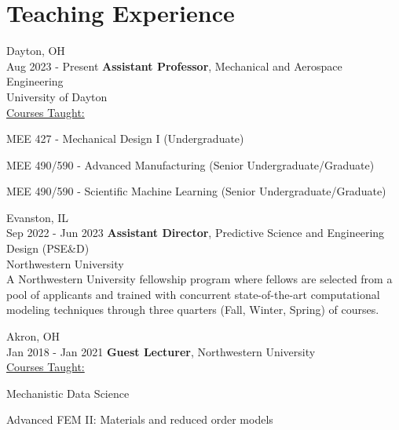 \documentclass[11pt, letterpaper]{article}
\begin{document}
\section{Teaching Experience}
    
    \begin{twocolentry}{
        Dayton, OH\\
        Aug 2023 - Present
    }
        \textbf{Assistant Professor}, Mechanical and Aerospace Engineering\\
        University of Dayton\\
        \uline{Courses Taught:} 
            \begin{highlightsforbulletentries}
                \item MEE 427 - Mechanical Design I (Undergraduate)
                \item MEE 490/590 - Advanced Manufacturing (Senior Undergraduate/Graduate)
                \item MEE 490/590 - Scientific Machine Learning (Senior Undergraduate/Graduate)
            \end{highlightsforbulletentries}
    \end{twocolentry}
    \vspace{5 pt}

    \begin{twocolentry}{
        Evanston, IL\\
        Sep 2022 - Jun 2023
    }
        \textbf{Assistant Director}, Predictive Science and Engineering Design (PSE\&D)\\ Northwestern University\\
        A Northwestern University fellowship program where fellows are selected
from a pool of applicants and trained with concurrent state-of-the-art
computational modeling techniques through three quarters (Fall, Winter,
Spring) of courses.
    \end{twocolentry}
    \vspace{5 pt}

    \begin{twocolentry}{
        Akron, OH\\
        Jan 2018 - Jan 2021
    }
        \textbf{Guest Lecturer}, Northwestern University\\
        \uline{Courses Taught:} 
            \begin{highlightsforbulletentries}
                \item Mechanistic Data Science
                \item Advanced FEM II: Materials and reduced order models
            \end{highlightsforbulletentries}
    \end{twocolentry}
    \vspace{5 pt}
\end{document}

